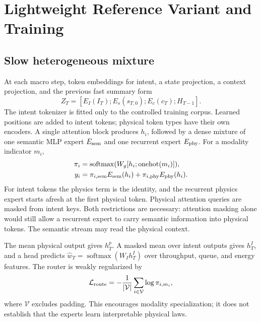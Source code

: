 \documentclass[10pt,twocolumn]{article}
\begin{document}
\section{Lightweight Reference Variant and Training}
\subsection{Slow heterogeneous mixture}
At each macro step, token embeddings for intent, a state projection, a context
projection, and the previous fast summary form
\begin{equation}
 Z_T=[E_I(I_T);E_s(s_{T,0});E_c(c_T);H_{T-1}].
\end{equation}
The intent tokenizer is fitted only to the controlled training corpus. Learned
positions are added to intent tokens; physical token types have their own
encoders. A single attention block produces $h_i$, followed by a dense mixture
of one semantic MLP expert $E_{\rm sem}$ and one recurrent expert
$E_{\rm phy}$. For a modality indicator $m_i$,
\begin{align}
 \pi_i &=\operatorname{softmax}(W_g[h_i;\operatorname{onehot}(m_i)]),\\
 y_i &=\pi_{i,\rm sem}E_{\rm sem}(h_i)
       +\pi_{i,\rm phy}E_{\rm phy}(h_i).
\end{align}
For intent tokens the physics term is the identity, and the recurrent physics
expert starts afresh at the first physical token. Physical attention queries
are masked from intent keys. Both restrictions are necessary: attention masking
alone would still allow a recurrent expert to carry semantic information into
physical tokens. The semantic stream may read the physical context.

The mean physical output gives $h_T^p$. A masked mean over intent outputs gives
$h_T^I$, and a head predicts
$\hat w_T=\operatorname{softmax}(W_I h_T^I)$ over throughput, queue, and energy
features. The router is weakly regularized by
\begin{equation}
 \mathcal L_{\rm route}=-\frac{1}{|\mathcal V|}
 \sum_{i\in\mathcal V}\log\pi_{i,m_i},
\end{equation}
where $\mathcal V$ excludes padding. This encourages modality specialization;
it does not establish that the experts learn interpretable physical laws.
\end{document}
